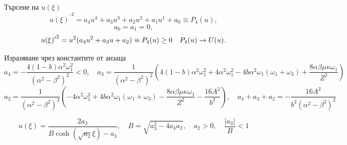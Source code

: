 \documentclass[bulg]{beamer}
\begin{document}
\begin{frame}
  \begin{alertblock}{Търсене на $u(\xi)$}
\begin{equation*}
  {u(\xi)^\prime}^2 = a_4 u^4 + a_3 u^3 + a_2 u^2 + a_1 u^1 + a_0 \equiv
  P_4(u),
  \label{eq:diffu2}
\end{equation*}
\begin{equation*}
a_0 = a_1 =0,
\end{equation*}
\begin{equation*}
  {u(\xi)^\prime}^2 = u^2(a_4 u^2 + a_3u + a_2)\equiv P_4(u)\geq 0
\quad P_4(u) \rightarrow  U(u).\\
  \label{eq:diffu}
\end{equation*}
\end{alertblock}

\begin{exampleblock}{Изразяване чрез константите от анзаца}
\tiny
\begin{equation*}
a_{4}=-\frac{4(1-b) \alpha^{2}
\omega_{1}^{2}}{\left(\alpha^{2}-\beta^{2}\right)^{2}}<0, \quad
  a_{3}=\frac{1}{(\alpha^2-\beta^2)^2}\left(4(1-b) \alpha^{2} \omega_{1}^{2}+4
    \alpha^{2} \omega_{1}^{2}-4 b \alpha^{2}
    \omega_{1}\left(\omega_{1}+\omega_{3}\right)+\frac{8 \alpha \beta \mu
  \kappa \omega_{1}}{Z^{2}}\right)
\end{equation*}
\begin{equation*}
  a_{2}=\frac{1}{(\alpha^2-\beta^2)^2}\left(-4 \alpha^{2} \omega_{1}^{2}+4
    b \alpha^{2} \omega_{1}\left(\omega_{1}+\omega_{3}\right)-\frac{8 \alpha
      \beta \mu \kappa \omega_{1}}{Z^{2}}-\frac{16
  A^{2}}{b^{2}}\right),\quad
  a_4 + a_3 + a_2 = -\frac{16 A^2}{b^2(\alpha^2-\beta^2)^2}
  \label{eq:polynomialandansatz}
\end{equation*}
\end{exampleblock}
  \begin{equation*}
    u(\xi)=\frac{2a_2}{B\cosh
    \left(\sqrt{a_{2}}\xi\right)-a_3},\quad B = \sqrt{a_{3}^{2}-4 a_{4}
  a_{2}},\quad a_2>0,\quad\frac{|a_3|}{B}<1
  \end{equation*}
\end{frame}
\end{document}

